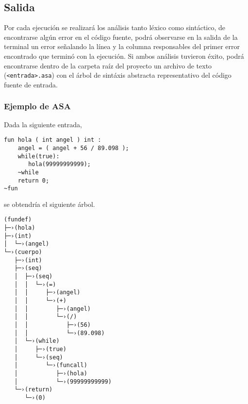 \documentclass[12pt]{article}
\begin{document}
\subsection{Salida}
Por cada ejecución se realizará los análisis tanto léxico como sintáctico, de encontrarse algún error en el código fuente, podrá observarse en la salida de la terminal un error señalando la línea y la columna responsables del primer error encontrado que terminó con la ejecución. Si ambos análisis tuvieron éxito, podrá encontrarse dentro de la carpeta raíz del proyecto un archivo de texto (\texttt{<entrada>.asa}) con el árbol de sintáxis abstracta representativo del código fuente de entrada.

\subsubsection*{Ejemplo de ASA}
Dada la siguiente entrada,

\begin{verbatim}
fun hola ( int angel ) int : 
    angel = ( angel + 56 / 89.098 );
    while(true):
       hola(99999999999);
    ~while
    return 0;
~fun
\end{verbatim}
se obtendría el siguiente árbol.
\begin{verbatim}
(fundef)
├─›(hola)
├─›(int)
│  └─›(angel)
└─›(cuerpo)
   ├─›(int)
   ├─›(seq)
   │  ├─›(seq)
   │  │  └─›(=)
   │  │     ├─›(angel)
   │  │     └─›(+)
   │  │        ├─›(angel)
   │  │        └─›(/)
   │  │           ├─›(56)
   │  │           └─›(89.098)
   │  └─›(while)
   │     ├─›(true)
   │     └─›(seq)
   │        └─›(funcall)
   │           ├─›(hola)
   │           └─›(99999999999)
   └─›(return)
      └─›(0)

\end{verbatim}
\end{document}
